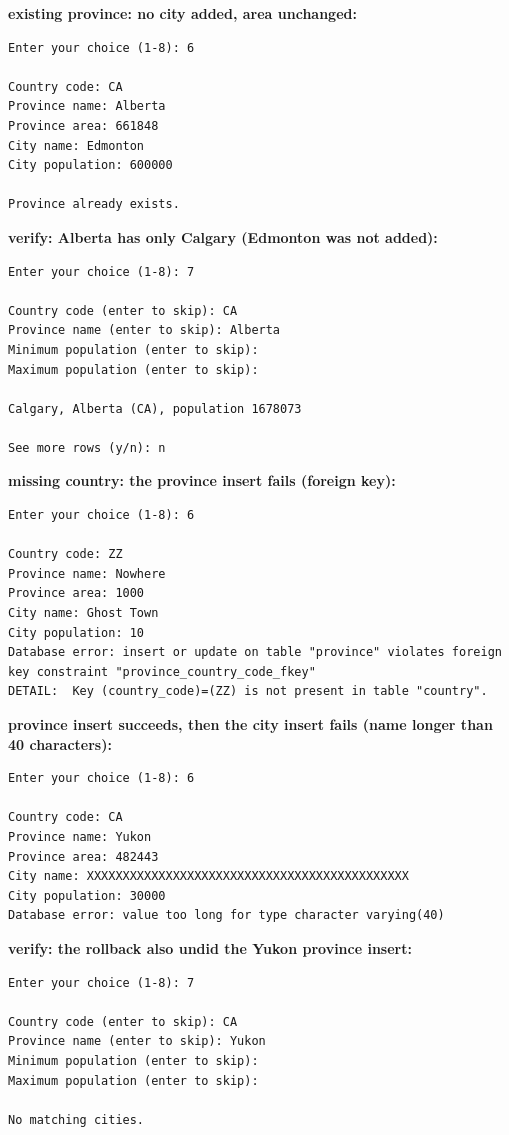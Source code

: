 \documentclass[11pt]{article}
\begin{document}
\noindent \textbf{existing province: no city added, area unchanged:}
{\small
\begin{verbatim}
Enter your choice (1-8): 6

Country code: CA
Province name: Alberta
Province area: 661848
City name: Edmonton
City population: 600000

Province already exists.
\end{verbatim}
}

\noindent \textbf{verify: Alberta has only Calgary (Edmonton was not added):}
{\small
\begin{verbatim}
Enter your choice (1-8): 7

Country code (enter to skip): CA
Province name (enter to skip): Alberta
Minimum population (enter to skip): 
Maximum population (enter to skip): 

Calgary, Alberta (CA), population 1678073

See more rows (y/n): n
\end{verbatim}
}

\noindent \textbf{missing country: the province insert fails (foreign key):}
{\tiny
\begin{verbatim}
Enter your choice (1-8): 6

Country code: ZZ
Province name: Nowhere
Province area: 1000
City name: Ghost Town
City population: 10
Database error: insert or update on table "province" violates foreign key constraint "province_country_code_fkey"
DETAIL:  Key (country_code)=(ZZ) is not present in table "country".
\end{verbatim}
}

\noindent \textbf{province insert succeeds, then the city insert fails (name longer than 40 characters):}
{\small
\begin{verbatim}
Enter your choice (1-8): 6

Country code: CA
Province name: Yukon
Province area: 482443
City name: XXXXXXXXXXXXXXXXXXXXXXXXXXXXXXXXXXXXXXXXXXXXX
City population: 30000
Database error: value too long for type character varying(40)
\end{verbatim}
}

\noindent \textbf{verify: the rollback also undid the Yukon province insert:}
{\small
\begin{verbatim}
Enter your choice (1-8): 7

Country code (enter to skip): CA
Province name (enter to skip): Yukon
Minimum population (enter to skip): 
Maximum population (enter to skip): 

No matching cities.
\end{verbatim}
}
\end{document}
